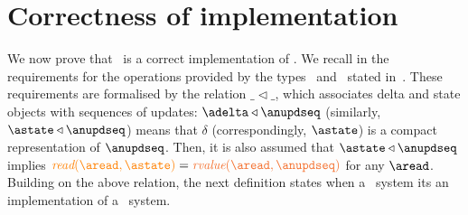 
\section{Correctness of implementation}
\label{sec:simulation}

We now prove that  \igsp\ is a correct implementation 
of \gsp. We recall in  the requirements for the
operations provided by the  types 
\statetype\ and \deltatype\ stated in~\cite{}. 
These requirements are formalised by the relation $\_\triangleleft \_$, which associates 
 delta and state objects with sequences of updates: $\adelta\triangleleft\anupdseq$
 (similarly, $\astate\triangleleft\anupdseq$)  means  that $\delta$ (correspondingly, $\astate$) 
 is a compact representation of $\anupdseq$. Then, it is also assumed that 
$\astate\triangleleft\anupdseq$ implies  $\iread \aread \astate  = \rvalue \aread  \anupdseq$ for any $\aread$.
Building on the above relation, the next definition states when a
\igsp\ system its an implementation of a \gsp\ system.

